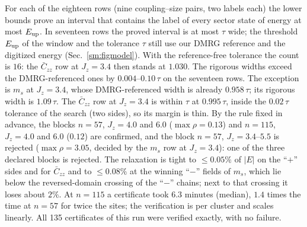 \documentclass[aps,prx,onecolumn,10pt,nofootinbib,longbibliography,floatfix]{revtex4-2}
\theoremstyle{remark}
\newcommand{\Jz}{J_z}
\newcommand{\ms}{m_s}
\newcommand{\Czz}{\bar C_{zz}}
\begin{document}
For each of the eighteen rows (nine coupling--size pairs, two labels each) the lower bounds prove an interval that
contains the label of every sector state of energy at most $E_{\rm up}$. In seventeen rows the proved interval is at
most $\tau$ wide; the threshold $E_{\rm up}$ of the window and the tolerance $\tau$ still use our DMRG reference and the
digitized energy (Sec.~\ref{sm:figmodel}). With the reference-free tolerance the count is $16$: the $\Czz$ row at %
$\Jz=3.4$ then stands at $1.030$. The rigorous %
widths exceed the DMRG-referenced ones by $0.004$--$0.10\,\tau$ on the seventeen rows. The exception is $\ms$ at %
$\Jz=3.4$, whose DMRG-referenced width is already $0.958\,\tau$; its rigorous width is $1.09\,\tau$. The $\Czz$ row at %
$\Jz=3.4$ is within $\tau$ at $0.995\,\tau$, inside the $0.02\,\tau$ tolerance of the search (two sides), so its margin is thin. By the %
rule fixed in advance, the blocks $n=57$, $\Jz=4.0$ and $6.0$ ($\max\rho=0.13$) and $n=115$, $\Jz=4.0$ and $6.0$ %
($0.12$) are confirmed, and the block $n=57$, $\Jz=3.4$--$5.5$ is rejected ($\max\rho=3.05$, decided by the $\ms$ row %
at $\Jz=3.4$): one of the three declared blocks is rejected. The relaxation is tight to $\le0.05\%$ of $|E|$ on the ``$+$'' sides and for $\Czz$ and to $\le0.08\%$ at %
the winning ``$-$'' fields of $\ms$, which lie below the reversed-domain crossing of the ``$-$'' chains; next to that crossing it loses about $2\%$. At $n=115$ a %
certificate took $6.3$ minutes (median), $1.4$ times the time at $n=57$ for twice the sites; the verification is per %
cluster and scales linearly. All 135 certificates of this run were verified exactly, with no failure. %
\end{document}
